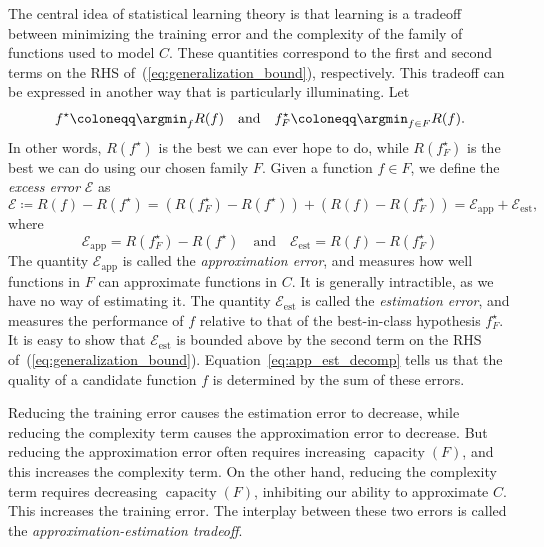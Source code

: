 \documentclass[11pt,a4paper]{article}
\numberwithin{equation}{section}
\newcommand{\capacity}{\operatorname{capacity}}
\newcommand{\apperr}{\mathcal{E}_{\mathrm{app}}}
\newcommand{\esterr}{\mathcal{E}_{\mathrm{est}}}
\begin{document}
The central idea of statistical learning theory is that learning is a tradeoff
between minimizing the training error and the complexity of the family of
functions used to model $C$. These quantities correspond to the first and second
terms on the RHS of~(\ref{eq:generalization_bound}), respectively. This tradeoff
can be expressed in another way that is particularly illuminating. Let
\[
	f^\star \coloneqq \argmin_{f} R(f) \quad\text{and}\quad
	f_F^\star \coloneqq \argmin_{f \in F} R(f).
\]
In other words, $R(f^\star)$ is the best we can ever hope to do, while
$R(f_F^\star)$ is the best we can do using our chosen family $F$. Given a
function $f \in F$, we define the \emph{excess error} $\mathcal{E}$ as
\begin{equation}
	\mathcal{E} \coloneqq R(f) - R(f^\star)
		= (R(f_F^\star) - R(f^\star)) + (R(f) - R(f_F^\star))
		= \apperr + \esterr,
	\label{eq:app_est_decomp}
\end{equation}
where
\[
	\apperr = R(f_F^\star) - R(f^\star)
	\quad\text{and}\quad
	\esterr = R(f) - R(f_F^\star)
\]
The quantity $\apperr$ is called the \emph{approximation error}, and measures
how well functions in $F$ can approximate functions in $C$. It is generally
intractible, as we have no way of estimating it. The quantity $\esterr$ is
called the \emph{estimation error}, and measures the performance of $f$ relative
to that of the best-in-class hypothesis $f_F^\star$. It is easy to show that
$\esterr$ is bounded above by the second term on the RHS
of~(\ref{eq:generalization_bound}). Equation~\ref{eq:app_est_decomp} tells us
that the quality of a candidate function $f$ is determined by the sum of these
errors.

Reducing the training error causes the estimation error to decrease, while
reducing the complexity term causes the approximation error to decrease. But
reducing the approximation error often requires increasing $\capacity(F)$, and
this increases the complexity term. On the other hand, reducing the complexity
term requires decreasing $\capacity(F)$, inhibiting our ability to approximate
$C$. This increases the training error. The interplay between these two errors
is called the \emph{approximation-estimation tradeoff}.
\end{document}
